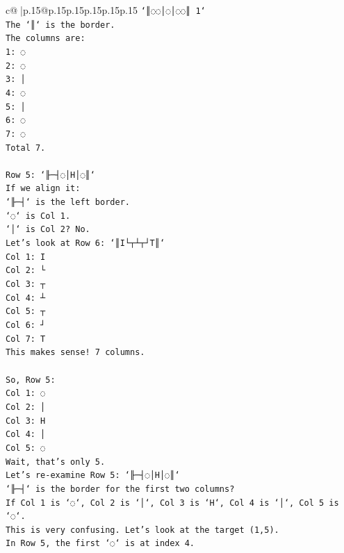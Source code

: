 \documentclass{article}
\begin{document}
{\begin{supertabular}{c@{$\;$}|p{.15\linewidth}@{}p{.15\linewidth}p{.15\linewidth}p{.15\linewidth}p{.15\linewidth}p{.15\linewidth}}
{{{\texttt{`║◌◌│◌│◌◌║ 1`} \\
\texttt{The `║` is the border.} \\
\texttt{The columns are:} \\
\texttt{1: ◌} \\
\texttt{2: ◌} \\
\texttt{3: │} \\
\texttt{4: ◌} \\
\texttt{5: │} \\
\texttt{6: ◌} \\
\texttt{7: ◌} \\
\texttt{Total 7.} \\
\\ 
\texttt{Row 5: `╟─┤◌│H│◌║`} \\
\texttt{If we align it:} \\
\texttt{`╟─┤` is the left border.} \\
\texttt{`◌` is Col 1.} \\
\texttt{`│` is Col 2? No.} \\
\texttt{Let's look at Row 6: `║I└┬┴┬┘T║`} \\
\texttt{Col 1: I} \\
\texttt{Col 2: └} \\
\texttt{Col 3: ┬} \\
\texttt{Col 4: ┴} \\
\texttt{Col 5: ┬} \\
\texttt{Col 6: ┘} \\
\texttt{Col 7: T} \\
\texttt{This makes sense! 7 columns.} \\
\\ 
\texttt{So, Row 5:} \\
\texttt{Col 1: ◌} \\
\texttt{Col 2: │} \\
\texttt{Col 3: H} \\
\texttt{Col 4: │} \\
\texttt{Col 5: ◌} \\
\texttt{Wait, that's only 5.} \\
\texttt{Let's re{-}examine Row 5: `╟─┤◌│H│◌║`} \\
\texttt{`╟─┤` is the border for the first two columns?} \\
\texttt{If Col 1 is `◌`, Col 2 is `│`, Col 3 is `H`, Col 4 is `│`, Col 5 is `◌`.} \\
\texttt{This is very confusing. Let's look at the target (1,5).} \\
\texttt{In Row 5, the first `◌` is at index 4.} \\
}}}
\end{supertabular}}
\end{document}
